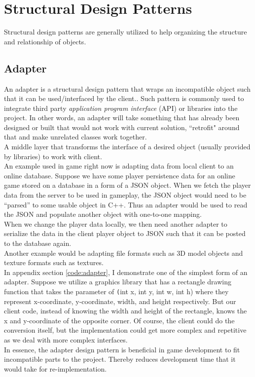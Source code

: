 \section{Structural Design Patterns}

\iftwocolumns
\begin{multicols}{2}
\fi

Structural design patterns are generally utilized to help organizing the structure and relationship of objects.

\subsection{Adapter}

An adapter is a structural design pattern that wraps an incompatible object such that it can be used/interfaced by the client.\cite{sm-adapter}. Such pattern is commonly used to integrate third party \textit{application program interface} (API) or libraries into the project. In other words, an adapter will take something that has already been designed or built that would not work with current solution, ``retrofit" around that and make unrelated classes work together.\cite{sm-adapter}\bs
\\
A middle layer that transforms the interface of a desired object (usually provided by libraries) to work with client.\bs
\\
An example used in game right now is adapting data from local client to an online database. Suppose we have some  player persistence data for an online game stored on a database in a form of a JSON object. When we fetch the player data from the server to be used in gameplay, the JSON object would need to be ``parsed'' to some usable object in C++. Thus an adapter would be used to read the JSON and populate another object with one-to-one mapping.\bs
\\
When we change the player data locally, we then need another adapter to serialize the data in the client player object to JSON such that it can be posted to the database again.\bs
\\
Another example would be adapting file formats such as 3D model objects and texture formats such as textures.\bs
\\
In appendix section \ref{code:adapter}, I demonstrate one of the simplest form of an adapter. Suppose we utilize a graphics library that has a rectangle drawing function that takes the parameter of \texttt(int x, int y, int w, int h) where they represent x-coordinate, y-coordinate, width, and height respectively. But our client code, instead of knowing the width and height of the rectangle, knows the x and y-coordinate of the opposite corner. Of course, the client could do the conversion itself, but the implementation could get more complex and repetitive as we deal with more complex interfaces.\bs
\\
In essence, the adapter design pattern is beneficial in game development to fit incompatible parts to the project. Thereby reduces development time that it would take for re-implementation.\bs
\\


\end{multicols}
